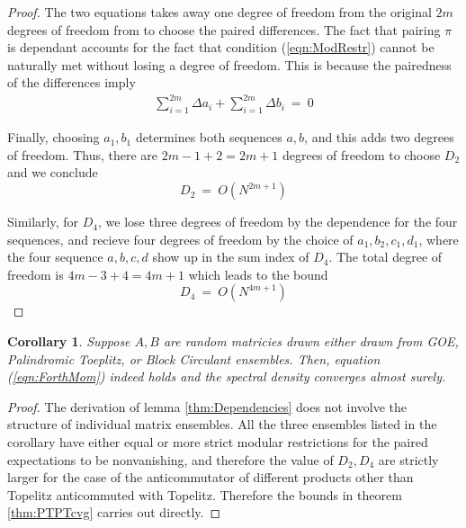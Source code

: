 \documentclass[12pt,reqno]{amsart}
\theoremstyle{plain} %
\newtheorem{cor}[theorem]{Corollary}
\theoremstyle{remark}
\theoremstyle{definition}
\begin{document}
\begin{proof}
    The two equations takes away one degree of freedom from the original 
    $2m$ degrees of freedom from to choose the paired differences. The 
    fact that pairing $\pi$ is dependant accounts for the fact 
    that condition (\ref{eqn:ModRestr}) cannot be naturally met without losing a degree of freedom. 
    This is because the pairedness of the differences imply  
      \begin{eqnarray}
        \sum_{i = 1}^{2m} \Delta a_i+ \sum_{i = 1}^{2m} \Delta b_i \ =\ 0 
    \end{eqnarray}

    Finally, choosing $a_1, b_1$ determines both sequences $a, b$, and 
    this adds two degrees of freedom. Thus, there are $2m -1 + 2 = 2m + 1$ 
    degrees of freedom to choose $D_2$ and we conclude 
    \begin{equation}
        D_2 \ = \ O(N^{2m + 1})
    \end{equation}

    Similarly, for $D_4$, we lose three degrees of freedom by the dependence 
    for the four sequences, and recieve four degrees of freedom by the 
    choice of $a_1, b_2, c_1, d_1$, where the four sequence $a, b, c, d$ 
    show up in the sum index of $D_4$. The total degree of freedom is 
    $4m - 3 + 4 = 4m + 1$ which leads to the bound 
    \begin{equation}
        D_4 \ = \ O(N^{4m + 1})
    \end{equation}

\end{proof}

\begin{cor}
    Suppose $A, B$ are random matricies drawn either drawn from GOE, 
    Palindromic Toeplitz, or Block Circulant ensembles. Then, equation (\ref{eqn:ForthMom}) indeed holds and 
    the spectral density converges almost surely. 
\end{cor}

\begin{proof}
    The derivation of lemma \ref{thm:Dependencies} 
    does not involve the structure of individual matrix ensembles.
    All the three ensembles listed in the corollary have either 
    equal or more strict modular restrictions for the paired expectations 
    to be nonvanishing, and therefore the value of $D_2, D_4$ are strictly 
    larger for the case of the anticommutator of different products 
    other than Topelitz anticommuted with Topelitz. Therefore the bounds in 
    theorem \ref{thm:PTPTcvg} carries out directly. 
\end{proof}
\end{document}
